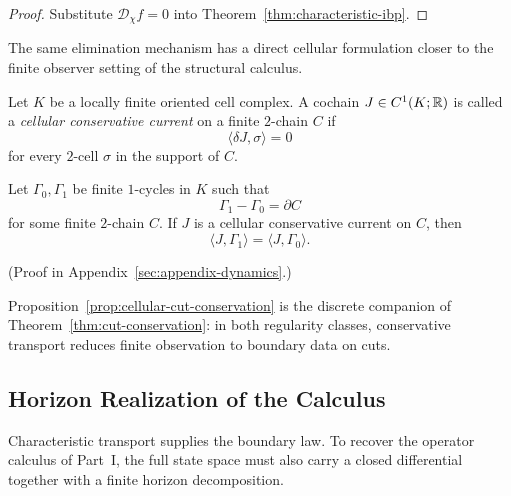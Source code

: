 \begin{proof}
Substitute $\mathcal D_\chi f = 0$ into
Theorem~\ref{thm:characteristic-ibp}.
\end{proof}

The same elimination mechanism has a direct cellular formulation closer to the
finite observer setting of the structural calculus.

\begin{definition}
\label{def:cellular-current}
Let $K$ be a locally finite oriented cell complex. A cochain
$J \in C^1(K;\mathbb{R})$ is called a \emph{cellular conservative current} on a finite
$2$-chain $C$ if
\[
\langle \delta J,\sigma\rangle = 0
\]
for every $2$-cell $\sigma$ in the support of $C$.
\end{definition}

\begin{proposition}
\label{prop:cellular-cut-conservation}
Let $\Gamma_0,\Gamma_1$ be finite $1$-cycles in $K$ such that
\[
\Gamma_1-\Gamma_0=\partial C
\]
for some finite $2$-chain $C$. If $J$ is a cellular conservative current on
$C$, then
\[
\langle J,\Gamma_1\rangle = \langle J,\Gamma_0\rangle.
\]
\end{proposition}

(Proof in Appendix~\ref{sec:appendix-dynamics}.)

Proposition~\ref{prop:cellular-cut-conservation} is the discrete companion of
Theorem~\ref{thm:cut-conservation}: in both regularity classes, conservative
transport reduces finite observation to boundary data on cuts.

\subsection{Horizon Realization of the Calculus}

Characteristic transport supplies the boundary law. To recover the operator
calculus of Part~I, the full state space must also carry a closed differential
together with a finite horizon decomposition.

